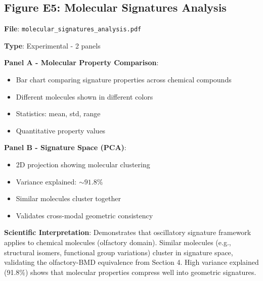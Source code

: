 \documentclass[11pt]{article}
\begin{document}
\subsection{Figure E5: Molecular Signatures Analysis}


\textbf{File}: \texttt{molecular\_signatures\_analysis.pdf}

\textbf{Type}: Experimental - 2 panels

\textbf{Panel A - Molecular Property Comparison}:
\begin{itemize}
\item Bar chart comparing signature properties across chemical compounds
\item Different molecules shown in different colors
\item Statistics: mean, std, range
\item Quantitative property values
\end{itemize}

\textbf{Panel B - Signature Space (PCA)}:
\begin{itemize}
\item 2D projection showing molecular clustering
\item Variance explained: $\sim 91.8\%$
\item Similar molecules cluster together
\item Validates cross-modal geometric consistency
\end{itemize}

\textbf{Scientific Interpretation}:
Demonstrates that oscillatory signature framework applies to chemical molecules (olfactory domain). Similar molecules (e.g., structural isomers, functional group variations) cluster in signature space, validating the olfactory-BMD equivalence from Section 4. High variance explained (91.8\%) shows that molecular properties compress well into geometric signatures.
\end{document}
